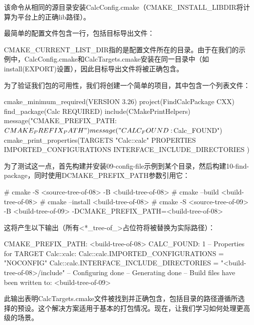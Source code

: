 该命令从相同的源目录安装CalcConfig.cmake（CMAKE\_INSTALL\_LIBDIR将计算为平台上的正确lib路径）。

最简单的配置文件包含一行，包括目标导出文件：



CMAKE\_CURRENT\_LIST\_DIR指的是配置文件所在的目录。由于在我们的示例中，CalcConfig.cmake和CalcTargets.cmake安装在同一目录中（如install(EXPORT)设置），因此目标导出文件将被正确包含。

为了验证我们包的可用性，我们将创建一个简单的项目，其中包含一个列表文件：


\begin{cmake}
cmake_minimum_required(VERSION 3.26)
project(FindCalcPackage CXX)
find_package(Calc REQUIRED)
include(CMakePrintHelpers)
message("CMAKE_PREFIX_PATH: ${CMAKE_PREFIX_PATH}")
message("CALC_FOUND: ${Calc_FOUND}")
cmake_print_properties(TARGETS "Calc::calc" PROPERTIES
    IMPORTED_CONFIGURATIONS
    INTERFACE_INCLUDE_DIRECTORIES
)
\end{cmake}

为了测试这一点，首先构建并安装09-config-file示例到某个目录，然后构建10-find-package，同时使用DCMAKE\_PREFIX\_PATH参数引用它：

\begin{shell}
# cmake -S <source-tree-of-08> -B <build-tree-of-08>
# cmake --build <build-tree-of-08>
# cmake --install <build-tree-of-08>
# cmake -S <source-tree-of-09> -B <build-tree-of-09>
        -DCMAKE_PREFIX_PATH=<build-tree-of-08>
\end{shell}

这将产生以下输出（所有<*\_tree-of\_>占位符将被替换为实际路径）：

\begin{shell}
CMAKE_PREFIX_PATH: <build-tree-of-08>
CALC_FOUND: 1
--
Properties for TARGET Calc::calc:
   Calc::calc.IMPORTED_CONFIGURATIONS = "NOCONFIG"
   Calc::calc.INTERFACE_INCLUDE_DIRECTORIES = "<build-tree-of-08>/include"
-- Configuring done
-- Generating done
-- Build files have been written to: <build-tree-of-09>
\end{shell}

此输出表明CalcTargets.cmake文件被找到并正确包含，包括目录的路径遵循所选择的预设。这个解决方案适用于基本的打包情况。现在，让我们学习如何处理更高级的场景。

